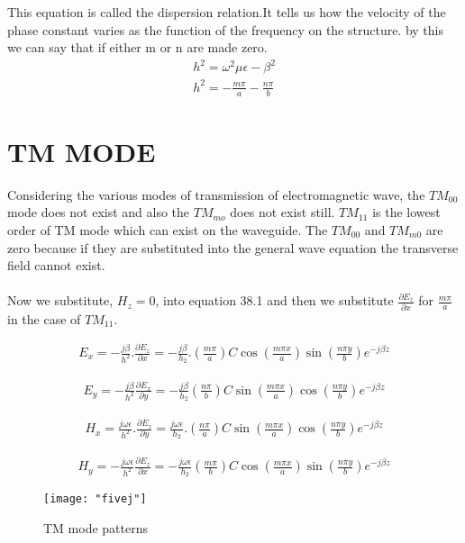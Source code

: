 This equation is called the dispersion relation.It tells us how the velocity of the phase constant varies as the function of the frequency on the structure. by this we can say that if either m or n are made zero.
\begin{align*}
h^{2} = \omega^2\mu\epsilon - \beta^{2}\\
h^{2} = -\frac{m\pi}{a} - \frac{n\pi}{b}
\end{align*} 
\section{TM  MODE}
Considering the various modes of transmission of electromagnetic wave, the $TM_{00}$ mode does not exist and also the $TM_{mo}$ does not exist still. $TM_{11}$ is the lowest order of TM mode which can exist on the waveguide. The $TM_{00}$ and $TM_{m0}$ are zero because if they are substituted into the general wave equation the transverse field cannot exist. 
\\
\\
Now we substitute, $H_{z} = 0$, into equation 38.1 and then we substitute
$\frac{\partial E_{z}}{\partial{x}}$ for $\frac{m \pi}{a}$ in the case of $TM_{11}$. 

\begin{align*}
E_x = -\frac{j \beta}{h^2}.\frac{\partial E_{z}}{\partial{x}} = -\frac{j \beta}{h_{2}}.(\frac{m\pi}{a}) C \cos (\frac{m\pi x}{a})\sin (\frac{n\pi y}{b})e^{-j \beta z}
\end{align*}

\begin{align*}
E_y = -\frac{j \beta}{h^2}\frac{\partial E_{x}}{\partial{y}} = -\frac{j \beta}{h_{2}}(\frac{n\pi}{b}) C \sin (\frac{m\pi x}{a})\cos (\frac{n\pi y}{b})e^{-j \beta z}
\end{align*}

\begin{align*}
H_x = \frac{j \omega\epsilon}{h^2}.\frac{\partial E_{z}}{\partial{y}} = \frac{j \omega\epsilon}{h_{2}}.(\frac{n\pi}{a}) C \sin (\frac{m\pi x}{a})\cos (\frac{n\pi y}{b})e^{-j \beta z}
\end{align*}

\begin{align*}
H_y =-\frac{j \omega\epsilon}{h^2}\frac{\partial E_{z}}{\partial{x}} = -\frac{j \omega\epsilon}{h_{2}}(\frac{m\pi}{b}) C \cos (\frac{m\pi x}{a})\sin (\frac{n\pi y}{b})e^{-j \beta z}
\end{align*}		      
\begin{figure}
	\centering
	\texttt{[image: "fivej"]}
	\caption{TM mode patterns}
	\label{fig:five}
\end{figure}

